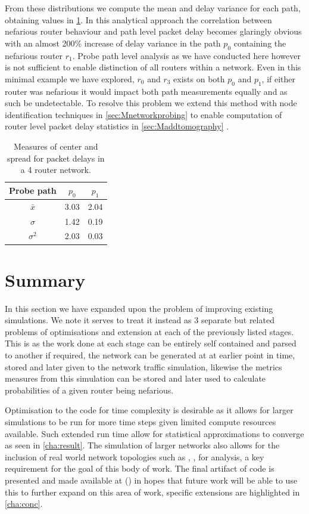 From these distributions we compute the mean and delay variance for each path, obtaining values in \cref{tbl:4routerstats}. In this analytical approach the correlation between nefarious router behaviour and path level packet delay becomes glaringly obvious with an almost 200\% increase of delay variance in the path $p_0$ containing the nefarious router $r_1$. Probe path level analysis as we have conducted here however is not sufficient to enable distinction of all routers within a network. Even in this minimal example we have explored, $r_0$ and $r_3$ exists on both $p_0$ and $p_1$, if either router was nefarious it would impact both path measurements equally and as such be undetectable. To resolve this problem we extend this method with node identification techniques in \cref{sec:Mnetworkprobing} to enable computation of router level packet delay statistics in \cref{sec:Maddtomography} .
\begin{table}[H]
    \centering
    \begin{tabular}{||c c c||}
        \hline
        Probe path & $p_0$ & $p_1$ \\ [0.5ex]
        \hline\hline
        $\bar{x}$   & 3.03 & 2.04 \\
        $\sigma$    & 1.42 & 0.19 \\
        $\sigma^2$  & 2.03 & 0.03 \\ [1ex]
        \hline
    \end{tabular}
    \caption{Measures of center and spread for packet delays in a 4 router network.}
    \label{tbl:4routerstats}
\end{table}

\section{Summary}
\label{sec:Iintroductionsummary}

In this section we have expanded upon the problem of improving existing simulations. We note it serves to treat it instead as 3 separate but related problems of optimisations and extension at each of the previously listed stages. This is as the work done at each stage can be entirely self contained and parsed to another if required, the network can be generated at at earlier point in time, stored and later given to the network traffic simulation, likewise the metrics measures from this simulation can be stored and later used to calculate probabilities of a given router being nefarious.\par
Optimisation to the code for time complexity is desirable as it allows for larger simulations to be run for more time steps given limited compute resources available. Such extended run time allow for statistical approximations to converge as seen in \cref{cha:result}. The simulation of larger networks also allows for the inclusion of real world network topologies such as \cite{cadi_caida_2002}, \cite{university_of_washington_rocketfuel_2002}, \cite{medina_brite_2001} for analysis, a key requirement for the goal of this body of work. The final artifact of code is presented and made available at (\cite{sylvester_millar_real_2021}) in hopes that future work will be able to use this to further expand on this area of work, specific extensions are highlighted in \cref{cha:conc}.